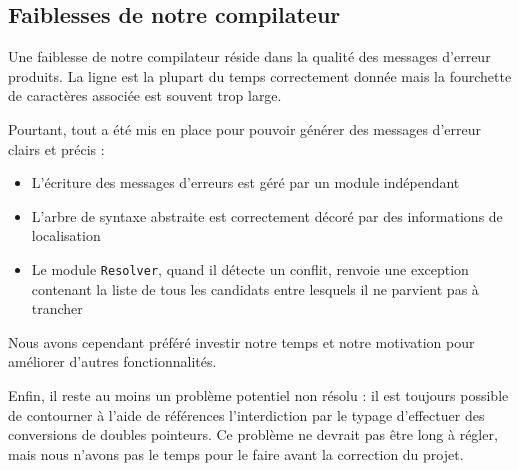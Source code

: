 \documentclass[11pt, a4paper]{article}
\newcommand{\prog}[1]{{\tt#1}}
\begin{document}
\subsection{Faiblesses de notre compilateur}

Une faiblesse de notre compilateur réside dans la qualité des messages d'erreur produits. La ligne est la plupart du temps correctement donnée mais la fourchette de caractères associée est souvent trop large.

Pourtant, tout a été mis en place pour pouvoir générer des messages d'erreur clairs et précis : 

\begin{itemize}
\item L'écriture des messages d'erreurs est géré par un module indépendant
\item L'arbre de syntaxe abstraite est correctement décoré par des informations de localisation
\item Le module \prog{Resolver}, quand il détecte un conflit, renvoie une exception contenant la liste de tous les candidats entre lesquels il ne parvient pas à trancher
\end{itemize}

\medskip
Nous avons cependant préféré investir notre temps et notre motivation pour améliorer d'autres fonctionnalités. 

\bigskip
Enfin, il reste au moins un problème potentiel non résolu : il est toujours possible de contourner à l'aide de références l'interdiction par le typage d'effectuer des conversions de doubles pointeurs. Ce problème ne devrait pas être long à régler, mais nous n'avons pas le temps pour le faire avant la correction du projet.
\end{document}
